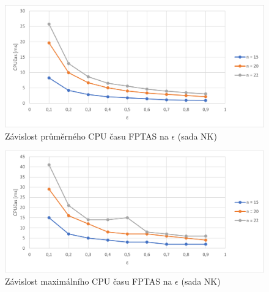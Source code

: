 \documentclass[12pt]{article}
\begin{document}
\begin{figure}[ht]\centering
    \includegraphics[width=1\textwidth, keepaspectratio]{graphs/NK/fptas/nk_fptas_eps_time_avg.png}
    \caption{Závislost průměrného CPU času FPTAS na $\epsilon$ (sada NK)}
    \label{fig:nk_fptas_eps_time_avg}
\end{figure}

\begin{figure}[ht]\centering
    \includegraphics[width=1\textwidth, keepaspectratio]{graphs/NK/fptas/nk_fptas_eps_time_max.png}
    \caption{Závislost maximálního CPU času FPTAS na $\epsilon$ (sada NK)}
    \label{fig:nk_fptas_eps_time_max}
\end{figure}
\end{document}
